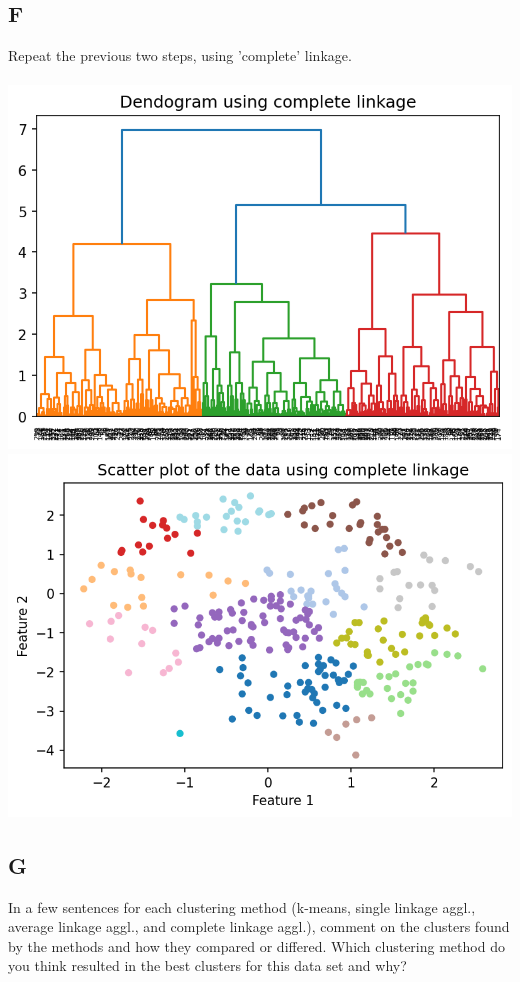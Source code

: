 \documentclass[12pt]{article}
\begin{document}
\subsection{F}
Repeat the previous two steps, using 'complete' linkage.\\\\
\includegraphics[width=1\textwidth]{p2.f.1.png}
\includegraphics[width=1\textwidth]{p2.f.2.png}




\subsection{G}
In a few sentences for each clustering method (k-means, single linkage aggl., average linkage aggl., and complete linkage aggl.), comment on the clusters found by the methods and how they compared or differed. Which clustering method do you think resulted in the best clusters for this data set and why?\\\\
\end{document}
